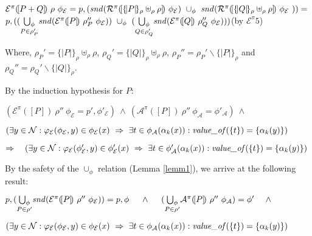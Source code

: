 \documentclass[10pt,a4paper,final,oneside,fleqn]{book}
\begin{document}
\noindent
$\mathcal{E}^\pi(\![P+Q]\!)~\rho~\phi_\mathcal{E}=p,(\mbox{{\itshape snd\/}}({\mathcal R}^\pi(\![\{\!|P|\!\}_\rho\uplus_\rho\rho]\!)~\phi_\mathcal{E})~\cup_\phi~\mbox{{\itshape snd\/}}({\mathcal R}^\pi(\![\{\!|Q|\!\}_\rho\uplus_\rho\rho]\!)~\phi_\mathcal{E}~))=$\\
$p,((\underset{P\in\rho_P'}{\bigcup_\phi}\mbox{{\itshape snd\/}}(\mathcal{E}^\pi(\![P]\!)~\rho_P''~\phi_\mathcal{E}))~\cup_\phi~(\underset{Q\in\rho_Q'}{\bigcup_\phi}\mbox{{\itshape snd\/}}(\mathcal{E}^\pi(\![Q]\!)~\rho_Q''~\phi_\mathcal{E})))$\hfill(by $\mathcal{E}^{\pi}5$)\vspace{5mm}

\noindent
Where, $\rho_P'=\{\!|P|\!\}_\rho\uplus_\rho\rho$, $\rho_Q'=\{\!|Q|\!\}_\rho\uplus_\rho\rho$, $\rho_P''=\rho_P'\backslash\{\!|P|\!\}_\rho$ and $\rho_Q''=\rho_Q'\backslash\{\!|Q|\!\}_\rho$.\vspace{5mm}

\noindent
By the induction hypothesis for $P$:

\noindent
$(\mathcal{E}^\pi(\![P]\!)~\rho''~\phi_{\mathcal{E}}=p',\phi'_\mathcal{E})~\wedge~(\mathcal{A}^\pi(\![P]\!)~\rho''~\phi_{\mathcal{A}}=\phi'_\mathcal{A})~\wedge$

\noindent
$(\exists y\in\mathcal{N}:\varphi_\mathcal{E}(\phi_\mathcal{E},y)\in\phi_\mathcal{E}(x)~\Rightarrow~\exists t\in\phi_\mathcal{A}(\alpha_k(x)):\mbox{{\itshape value\_of\/}}(\{t\})=\{\alpha_k(y)\})$\vspace{5mm}

\noindent
$\Rightarrow~~~(\exists y\in\mathcal{N}:\varphi_\mathcal{E}(\phi'_\mathcal{E},y)\in\phi'_\mathcal{E}(x)~\Rightarrow~\exists t\in\phi'_\mathcal{A}(\alpha_k(x)):\mbox{{\itshape value\_of\/}}(\{t\})=\{\alpha_k(y)\})$\vspace{5mm}

\noindent
By the safety of the $\cup_\phi$ relation (Lemma \ref{lemm1}), we arrive at the following result:

\noindent
$p,(\underset{P\in\rho'}{\bigcup_\phi}\mbox{{\itshape snd\/}}(\mathcal{E}^\pi(\![P]\!)~\rho''~\phi_{\mathcal{E}}))=p,\phi~~~~\wedge~~~~(\underset{P\in\rho'}{\bigcup_\phi}\mathcal{A}^\pi(\![P]\!)~\rho''~\phi_{\mathcal{A}})=\phi'~~~~\wedge$

\noindent
$(\exists y\in\mathcal{N}:\varphi_\mathcal{E}(\phi_\mathcal{E},y)\in\phi_\mathcal{E}(x)~\Rightarrow~\exists t\in\phi_\mathcal{A}(\alpha_k(x)):\mbox{{\itshape value\_of\/}}(\{t\})=\{\alpha_k(y)\})$\vspace{5mm}
\end{document}
